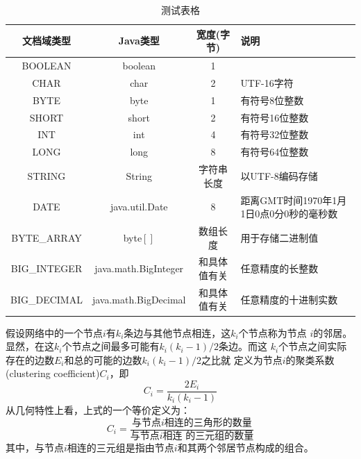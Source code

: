 \documentclass[bachelor,winfonts]{jnuthesis} %
\begin{document}
    \begin{table}
        \centering
        \begin{tabular}{cccp{38mm}}
            \toprule
            \textbf{文档域类型} & \textbf{Java类型} & \textbf{宽度(字节)} & \textbf{说明} \\
            \midrule
            BOOLEAN  & boolean &  1  & \\
            CHAR     & char    &  2  & UTF-16字符 \\
            BYTE     & byte    &  1  & 有符号8位整数 \\
            SHORT    & short   &  2  & 有符号16位整数 \\
            INT      & int     &  4  & 有符号32位整数 \\
            LONG     & long    &  8  & 有符号64位整数 \\
            STRING   & String  &  字符串长度  & 以UTF-8编码存储 \\
            DATE     & java.util.Date & 8 & 距离GMT时间1970年1月1日0点0分0秒的毫秒数 \\
            BYTE\_ARRAY & byte$[]$ & 数组长度 & 用于存储二进制值 \\
            BIG\_INTEGER & java.math.BigInteger & 和具体值有关 & 任意精度的长整数 \\
            BIG\_DECIMAL & java.math.BigDecimal & 和具体值有关 & 任意精度的十进制实数 \\
            \bottomrule
        \end{tabular}
        \caption{测试表格}\label{table:test4}
    \end{table}
    
    \begin{definition}[局部聚类系数]
        
        假设网络中的一个节点$i$有$k_i$条边与其他节点相连，这$k_i$个节点称为节点
        $i$的邻居。显然，在这$k_i$个节点之间最多可能有$k_i(k_i-1)/2$条边。而这
        $k_i$个节点之间实际存在的边数$E_i$和总的可能的边数$k_i(k_i-1)/2$之比就
        定义为节点$i$的聚类系数(clustering coefficient)$C_i$，即
        \begin{equation}\label{eq:clustering_coefficient}
        C_i = \frac{2E_i}{k_i(k_i-1)}
        \end{equation}
        从几何特性上看，上式的一个等价定义为：
        \begin{equation}\label{eq:clustering_coefficient_triangle}
        C_i = \frac{\text{与节点$i$相连的三角形的数量}}{\text{与节点$i$相连
                的三元组的数量}}
        \end{equation}
        其中，与节点$i$相连的三元组是指由节点$i$和其两个邻居节点构成的组合。
    \end{definition}
    
\end{document}
